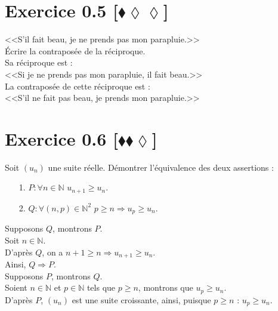 \documentclass[10pt]{article}
\begin{document}
\section*{Exercice 0.5 [$\blacklozenge\lozenge\lozenge$]}
\begin{tcolorbox}[enhanced, width=6in, center, size=fbox, fontupper=\large, drop shadow southwest]
    <<S'il fait beau, je ne prends pas mon parapluie.>>\\
    Écrire la contraposée de la réciproque.\\[0.5cm]
    Sa réciproque est :\\
    <<Si je ne prends pas mon parapluie, il fait beau.>>\\[0.5cm]
    La contraposée de cette réciproque est :\\
    <<S'il ne fait pas beau, je prends mon parapluie.>>
\end{tcolorbox}

\section*{Exercice 0.6 [$\blacklozenge\blacklozenge\lozenge$]}
\begin{tcolorbox}[enhanced, width=6in, center, size=fbox, fontupper=\large, drop shadow southwest]
    Soit $(u_n)$ une suite réelle. Démontrer l'équivalence des deux assertions :
    \begin{itemize}
        \item[1.] $P:\forall{n\in\mathbb{N}}$ \hspace{0.25cm} $u_{n+1} \geq u_n$. 
        \item[2.] $Q:\forall{(n,p)\in\mathbb{N}^2}$ \hspace{0.25cm} $p \geq n \Longrightarrow u_p \geq u_n$. 
    \end{itemize}
    Supposons $Q$, montrons $P$.\\
    Soit $n\in\mathbb{N}$.\\
    D'après $Q$, on a $n+1\geq n \Longrightarrow u_{n+1} \geq u_n$.\\
    Ainsi, $Q\Longrightarrow P$.\\[0.5cm]
    Supposons $P$, montrons $Q$.\\
    Soient $n\in\mathbb{N}$ et $p\in\mathbb{N}$ tels que $p\geq n$, montrons que $u_p\geq u_n$.\\
    D'après $P$, $(u_n)$ est une suite croissante, ainsi, puisque $p\geq n$ : $u_p\geq u_n$.
    \end{tcolorbox}
\end{document}
